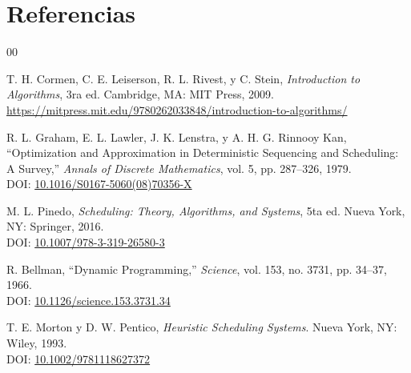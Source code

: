 \documentclass[conference, a4paper]{IEEEtran}
\begin{document}
\section{Referencias}
\begin{thebibliography}{00}

T. H. Cormen, C. E. Leiserson, R. L. Rivest, y C. Stein, \textit{Introduction to Algorithms}, 3ra ed. Cambridge, MA: MIT Press, 2009. \\
\url{https://mitpress.mit.edu/9780262033848/introduction-to-algorithms/}

R. L. Graham, E. L. Lawler, J. K. Lenstra, y A. H. G. Rinnooy Kan, ``Optimization and Approximation in Deterministic Sequencing and Scheduling: A Survey,'' \textit{Annals of Discrete Mathematics}, vol. 5, pp. 287--326, 1979. \\
DOI: \href{https://doi.org/10.1016/S0167-5060(08)70356-X}{10.1016/S0167-5060(08)70356-X}

M. L. Pinedo, \textit{Scheduling: Theory, Algorithms, and Systems}, 5ta ed. Nueva York, NY: Springer, 2016. \\
DOI: \href{https://doi.org/10.1007/978-3-319-26580-3}{10.1007/978-3-319-26580-3}

R. Bellman, ``Dynamic Programming,'' \textit{Science}, vol. 153, no. 3731, pp. 34--37, 1966. \\
DOI: \href{https://doi.org/10.1126/science.153.3731.34}{10.1126/science.153.3731.34}

T. E. Morton y D. W. Pentico, \textit{Heuristic Scheduling Systems}. Nueva York, NY: Wiley, 1993. \\
DOI: \href{https://doi.org/10.1002/9781118627372}{10.1002/9781118627372}

\end{thebibliography}
\end{document}
